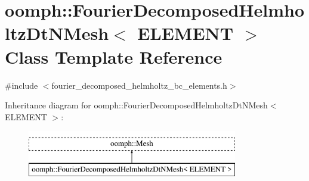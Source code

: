 \hypertarget{classoomph_1_1FourierDecomposedHelmholtzDtNMesh}{}\section{oomph\+:\+:Fourier\+Decomposed\+Helmholtz\+Dt\+N\+Mesh$<$ E\+L\+E\+M\+E\+NT $>$ Class Template Reference}
\label{classoomph_1_1FourierDecomposedHelmholtzDtNMesh}


{\ttfamily \#include $<$fourier\+\_\+decomposed\+\_\+helmholtz\+\_\+bc\+\_\+elements.\+h$>$}

Inheritance diagram for oomph\+:\+:Fourier\+Decomposed\+Helmholtz\+Dt\+N\+Mesh$<$ E\+L\+E\+M\+E\+NT $>$\+:\begin{figure}[H]
\begin{center}
\leavevmode
\includegraphics[height=2.000000cm]{classoomph_1_1FourierDecomposedHelmholtzDtNMesh}
\end{center}
\end{figure}
